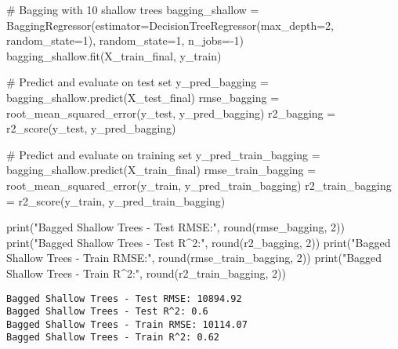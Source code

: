 \documentclass[
  letterpaper,
  DIV=11,
  numbers=noendperiod]{scrreprt}
\newenvironment{Shaded}{\begin{snugshade}}{\end{snugshade}}
\newcommand{\BuiltInTok}[1]{\textcolor[rgb]{0.00,0.23,0.31}{#1}}
\newcommand{\CommentTok}[1]{\textcolor[rgb]{0.37,0.37,0.37}{#1}}
\newcommand{\DecValTok}[1]{\textcolor[rgb]{0.68,0.00,0.00}{#1}}
\newcommand{\NormalTok}[1]{\textcolor[rgb]{0.00,0.23,0.31}{#1}}
\newcommand{\OperatorTok}[1]{\textcolor[rgb]{0.37,0.37,0.37}{#1}}
\newcommand{\StringTok}[1]{\textcolor[rgb]{0.13,0.47,0.30}{#1}}
\begin{document}
\begin{Shaded}
\begin{Highlighting}[]

\CommentTok{\# Bagging with 10 shallow trees}
\NormalTok{bagging\_shallow }\OperatorTok{=}\NormalTok{ BaggingRegressor(estimator}\OperatorTok{=}\NormalTok{DecisionTreeRegressor(max\_depth}\OperatorTok{=}\DecValTok{2}\NormalTok{, random\_state}\OperatorTok{=}\DecValTok{1}\NormalTok{),}
\NormalTok{                                    random\_state}\OperatorTok{=}\DecValTok{1}\NormalTok{,}
\NormalTok{                                    n\_jobs}\OperatorTok{={-}}\DecValTok{1}\NormalTok{)}
\NormalTok{bagging\_shallow.fit(X\_train\_final, y\_train)}

\CommentTok{\# Predict and evaluate on test set}
\NormalTok{y\_pred\_bagging }\OperatorTok{=}\NormalTok{ bagging\_shallow.predict(X\_test\_final)}
\NormalTok{rmse\_bagging }\OperatorTok{=}\NormalTok{ root\_mean\_squared\_error(y\_test, y\_pred\_bagging)}
\NormalTok{r2\_bagging }\OperatorTok{=}\NormalTok{ r2\_score(y\_test, y\_pred\_bagging)}

\CommentTok{\# Predict and evaluate on training set}
\NormalTok{y\_pred\_train\_bagging }\OperatorTok{=}\NormalTok{ bagging\_shallow.predict(X\_train\_final)}
\NormalTok{rmse\_train\_bagging }\OperatorTok{=}\NormalTok{ root\_mean\_squared\_error(y\_train, y\_pred\_train\_bagging)}
\NormalTok{r2\_train\_bagging }\OperatorTok{=}\NormalTok{ r2\_score(y\_train, y\_pred\_train\_bagging)}

\BuiltInTok{print}\NormalTok{(}\StringTok{"Bagged Shallow Trees {-} Test RMSE:"}\NormalTok{, }\BuiltInTok{round}\NormalTok{(rmse\_bagging, }\DecValTok{2}\NormalTok{))}
\BuiltInTok{print}\NormalTok{(}\StringTok{"Bagged Shallow Trees {-} Test R\^{}2:"}\NormalTok{, }\BuiltInTok{round}\NormalTok{(r2\_bagging, }\DecValTok{2}\NormalTok{))}
\BuiltInTok{print}\NormalTok{(}\StringTok{"Bagged Shallow Trees {-} Train RMSE:"}\NormalTok{, }\BuiltInTok{round}\NormalTok{(rmse\_train\_bagging, }\DecValTok{2}\NormalTok{))}
\BuiltInTok{print}\NormalTok{(}\StringTok{"Bagged Shallow Trees {-} Train R\^{}2:"}\NormalTok{, }\BuiltInTok{round}\NormalTok{(r2\_train\_bagging, }\DecValTok{2}\NormalTok{))}
\end{Highlighting}
\end{Shaded}

\begin{verbatim}
Bagged Shallow Trees - Test RMSE: 10894.92
Bagged Shallow Trees - Test R^2: 0.6
Bagged Shallow Trees - Train RMSE: 10114.07
Bagged Shallow Trees - Train R^2: 0.62
\end{verbatim}
\end{document}
